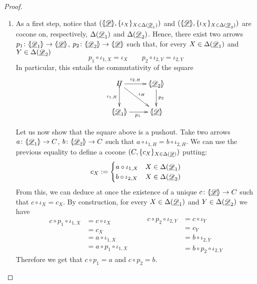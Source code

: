 \begin{proof}
\begin{enumerate}
		\item  As a first step, notice that $(\langle \hspace{-1.85pt}[ \underline{\mathscr{D}}]\hspace{-1.85pt}\rangle, \{\iota_X\}_{X\in \Delta(\underline{\mathscr{D}}_1)})$ and $(\langle \hspace{-1.85pt}[ \underline{\mathscr{D}}]\hspace{-1.85pt}\rangle, \{\iota_X\}_{X\in \Delta(\underline{\mathscr{D}}_2)})$ are cocone on, respectively, $\Delta(\underline{\mathscr{D}}_1)$ and $\Delta(\underline{\mathscr{D}}_2)$. Hence, there exist two arrows $p_1\colon \langle \hspace{-1.85pt}[ \underline{\mathscr{D}}_{1}]\hspace{-1.85pt}\rangle\to \langle \hspace{-1.85pt}[ \underline{\mathscr{D}}]\hspace{-1.85pt}\rangle$, $p_2\colon \langle \hspace{-1.85pt}[ \underline{\mathscr{D}}_{2}]\hspace{-1.85pt}\rangle\to \langle \hspace{-1.85pt}[ \underline{\mathscr{D}}]\hspace{-1.85pt}\rangle$ such that, for every $X\in  \Delta(\underline{\mathscr{D}}_1)$ and $Y\in  \Delta(\underline{\mathscr{D}}_2)$
		\[p_1\circ \iota_{1, X} = \iota_X \qquad p_2\circ \iota_{2, Y}=\iota_{2,Y}\]
		In particular, this entails the commutativity of the square
				\[\xymatrix{H \ar[dr]^{\iota_H} \ar[r]^-{\iota_{2, H}} \ar@{>->}[d]_-{\iota_{1, H}} & \tproi{D}{2} \ar[d]^{p_2}\\  \tproi{D}{1} \ar[r]_{p_1}& \tpro{D}}\]
		
	Let us now show that the square above is a pushout. Take two arrows $a\colon \langle \hspace{-1.85pt}[ \underline{\mathscr{D}}_{1}]\hspace{-1.85pt}\rangle\to C$, $b\colon \langle \hspace{-1.85pt}[ \underline{\mathscr{D}}_{2}]\hspace{-1.85pt}\rangle\to C$ such that $a\circ \iota_{1, H}=b\circ \iota_{2, H}$. We can use the previous equality to define a cocone $(C, \{c_X\}_{X\in \Delta(\underline{\mathscr{D}})})$ putting:
	\[c_X:=\begin{cases}
		a\circ \iota_{1, X} & X\in \Delta(\underline{\mathscr{D}}_1)\\
		b\circ \iota_{2, X} & X\in \Delta(\underline{\mathscr{D}}_2)
	\end{cases}\]
From this, we can deduce at once the existence of a unique $c\colon \langle \hspace{-1.85pt}[ \underline{\mathscr{D}}]\hspace{-1.85pt}\rangle\to C$ such that $c\circ \iota_X = c_X$. By construction, for every $X\in  \Delta(\underline{\mathscr{D}}_1)$ and $Y\in  \Delta(\underline{\mathscr{D}}_2)$ we have
\[\begin{split}
	c\circ p_1 \circ \iota_{1,X}&=c\circ \iota_{X}\\&=c_X \\&=a\circ \iota_{1,X}\\&=a\circ p_1\circ \iota_{1,X}
\end{split}\qquad \begin{split}
	c\circ p_2 \circ \iota_{2,Y}&=c\circ \iota_{Y}\\&=c_Y \\&=b\circ \iota_{2,Y}\\&=b\circ p_2\circ \iota_{2,Y}
\end{split}\]
Therefore we get that $c\circ p_1=a$ and $c\circ p_2 = b$.


\end{enumerate}
\end{proof}
